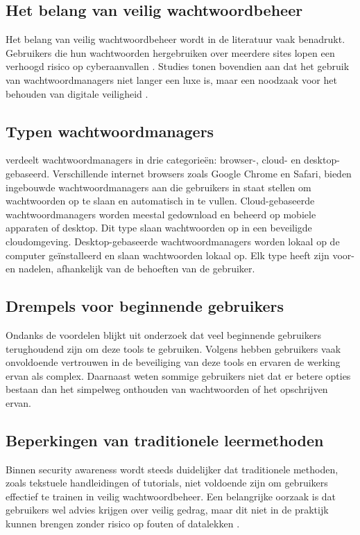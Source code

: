 \subsection{Het belang van veilig wachtwoordbeheer}

Het belang van veilig wachtwoordbeheer wordt in de literatuur vaak benadrukt. Gebruikers die hun wachtwoorden hergebruiken over meerdere sites lopen een verhoogd risico op cyberaanvallen \autocite{Gaw2006}. Studies tonen bovendien aan dat het gebruik van wachtwoordmanagers niet langer een luxe is, maar een noodzaak voor het behouden van digitale veiligheid \autocite{CMU2025}.

\subsection{Typen wachtwoordmanagers}
\textcite{Zawalnyski2025} verdeelt wachtwoordmanagers in drie categorieën: browser-, cloud- en desktop-gebaseerd. Verschillende internet browsers zoals Google Chrome en Safari, bieden ingebouwde wachtwoordmanagers aan die gebruikers in staat stellen om wachtwoorden op te slaan en automatisch in te vullen. Cloud-gebaseerde wachtwoordmanagers worden meestal gedownload en beheerd op mobiele apparaten of desktop. Dit type slaan wachtwoorden op in een beveiligde cloudomgeving. Desktop-gebaseerde wachtwoordmanagers worden lokaal op de computer geïnstalleerd en slaan wachtwoorden lokaal op. 
Elk type heeft zijn voor- en nadelen, afhankelijk van de behoeften van de gebruiker.

\subsection{Drempels voor beginnende gebruikers}
Ondanks de voordelen blijkt uit onderzoek dat veel beginnende gebruikers terughoudend zijn om deze tools te gebruiken. Volgens \textcite{Pearman2019} hebben gebruikers vaak onvoldoende vertrouwen in de beveiliging van deze tools en ervaren de werking ervan als complex. Daarnaast weten sommige gebruikers niet dat er betere opties bestaan dan het simpelweg onthouden van wachtwoorden of het opschrijven ervan.  

\subsection{Beperkingen van traditionele leermethoden}
Binnen security awareness wordt steeds duidelijker dat traditionele methoden, zoals tekstuele handleidingen of tutorials, niet voldoende zijn om gebruikers effectief te trainen in veilig wachtwoordbeheer. Een belangrijke oorzaak is dat gebruikers wel advies krijgen over veilig gedrag, maar dit niet in de praktijk kunnen brengen zonder risico op fouten of datalekken \autocite{Sugatan2020}. 

